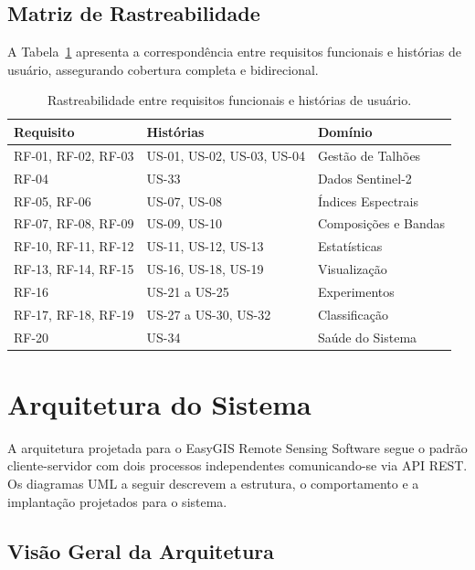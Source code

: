 \documentclass[12pt, a4paper]{article}
\begin{document}
\subsection{Matriz de Rastreabilidade}

A Tabela~\ref{tab:rastreabilidade} apresenta a correspondência entre requisitos funcionais e histórias de usuário, assegurando cobertura completa e bidirecional.

\begin{table}[H]
\centering
\caption{Rastreabilidade entre requisitos funcionais e histórias de usuário.}
\label{tab:rastreabilidade}
\footnotesize
\begin{tabular}{lll}
\toprule
\textbf{Requisito} & \textbf{Histórias} & \textbf{Domínio} \\
\midrule
RF-01, RF-02, RF-03 & US-01, US-02, US-03, US-04 & Gestão de Talhões \\
RF-04 & US-33 & Dados Sentinel-2 \\
RF-05, RF-06 & US-07, US-08 & Índices Espectrais \\
RF-07, RF-08, RF-09 & US-09, US-10 & Composições e Bandas \\
RF-10, RF-11, RF-12 & US-11, US-12, US-13 & Estatísticas \\
RF-13, RF-14, RF-15 & US-16, US-18, US-19 & Visualização \\
RF-16 & US-21 a US-25 & Experimentos \\
RF-17, RF-18, RF-19 & US-27 a US-30, US-32 & Classificação \\
RF-20 & US-34 & Saúde do Sistema \\
\bottomrule
\end{tabular}
\end{table}

\section{Arquitetura do Sistema}

A arquitetura projetada para o EasyGIS Remote Sensing Software segue o padrão cliente-servidor com dois processos independentes comunicando-se via API REST. Os diagramas UML a seguir descrevem a estrutura, o comportamento e a implantação projetados para o sistema.

\subsection{Visão Geral da Arquitetura}
\end{document}
